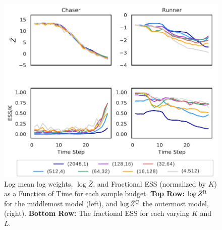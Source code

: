 \documentclass[twoside]{article}
\begin{document}




\begin{figure}[!t]
\begin{center}
\centerline{
\hspace{-0.2em}\includegraphics[width=0.95\columnwidth]{PLOT_A_4Part_Crop.pdf}}
\caption{ Log mean log weights, $\log \bar{Z}$, and Fractional ESS (normalized by $K$) as a Function of Time for each sample budget. \textbf{Top Row:}  $\log \bar{Z}^\textsc{R}$ for the middlemost model (left), and $\log \bar{Z}^\textsc{C}$ the outermost model, (right). \textbf{Bottom Row:} The fractional ESS for each varying $K$ and $L$.  }
\label{fig:log_means}
\end{center}
\vskip -0.4in
\end{figure} 

\end{document}
